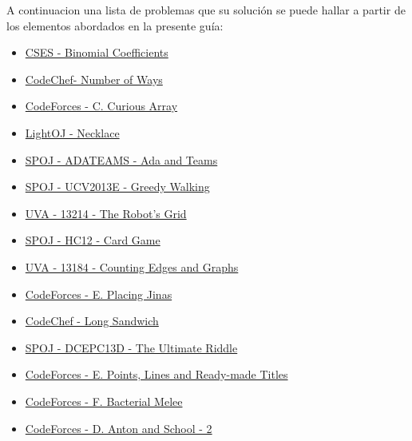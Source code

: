 A continuacion una lista de problemas que su solución se puede hallar a partir de los elementos abordados en la presente guía:

\begin{itemize}
	\item \href{https://cses.fi/problemset/task/1079}{CSES - Binomial Coefficients}
	\item \href{https://www.codechef.com/LTIME24/problems/NWAYS/}{CodeChef- Number of Ways}
	\item \href{https://codeforces.com/problemset/problem/407/C}{CodeForces - C. Curious Array}
	\item \href{https://lightoj.com/problem/necklace}{LightOJ - Necklace}
	\item \href{https://www.spoj.com/problems/ADATEAMS/}{SPOJ - ADATEAMS - Ada and Teams}
	\item \href{https://www.spoj.com/problems/UCV2013E/}{SPOJ - UCV2013E - Greedy Walking}
	\item \href{https://onlinejudge.org/index.php?option=com_onlinejudge&Itemid=8&page=show_problem&problem=5137}{UVA - 13214 - The Robot's Grid}
	\item \href{https://www.spoj.com/problems/HC12/}{SPOJ - HC12 - Card Game}
	\item \href{https://onlinejudge.org/index.php?option=onlinejudge&page=show_problem&problem=5095}{UVA - 13184 - Counting Edges and Graphs}
	\item \href{https://codeforces.com/problemset/problem/1696/E}{CodeForces - E. Placing Jinas}
	\item \href{https://www.codechef.com/MAY17/problems/SANDWICH/}{CodeChef - Long Sandwich}
	\item \href{https://www.spoj.com/problems/DCEPC13D/}{SPOJ - DCEPC13D - The Ultimate Riddle}
	\item \href{https://codeforces.com/contest/872/problem/E}{CodeForces - E. Points, Lines and Ready-made Titles}
	\item \href{https://codeforces.com/contest/760/problem/F}{CodeForces - F. Bacterial Melee}
	\item \href{https://codeforces.com/contest/785/problem/D}{CodeForces - D. Anton and School - 2}
	
\end{itemize}